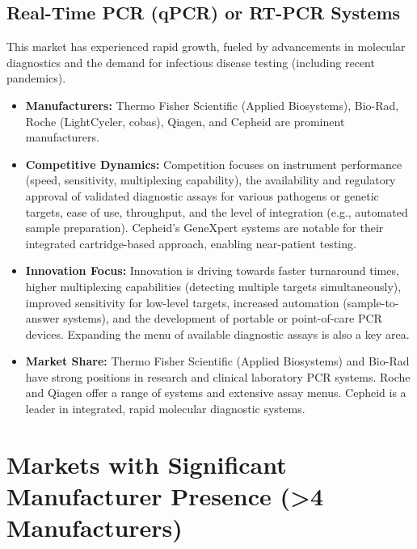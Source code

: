 \documentclass{article}
\begin{document}
\subsection{Real-Time PCR (qPCR) or RT-PCR Systems}
This market has experienced rapid growth, fueled by advancements in molecular diagnostics and the demand for infectious disease testing (including recent pandemics).
\begin{itemize}
    \item \textbf{Manufacturers:} Thermo Fisher Scientific (Applied Biosystems), Bio-Rad, Roche (LightCycler, cobas), Qiagen, and Cepheid are prominent manufacturers.
    \item \textbf{Competitive Dynamics:} Competition focuses on instrument performance (speed, sensitivity, multiplexing capability), the availability and regulatory approval of validated diagnostic assays for various pathogens or genetic targets, ease of use, throughput, and the level of integration (e.g., automated sample preparation). Cepheid's GeneXpert systems are notable for their integrated cartridge-based approach, enabling near-patient testing.
    \item \textbf{Innovation Focus:} Innovation is driving towards faster turnaround times, higher multiplexing capabilities (detecting multiple targets simultaneously), improved sensitivity for low-level targets, increased automation (sample-to-answer systems), and the development of portable or point-of-care PCR devices. Expanding the menu of available diagnostic assays is also a key area.
    \item \textbf{Market Share:} Thermo Fisher Scientific (Applied Biosystems) and Bio-Rad have strong positions in research and clinical laboratory PCR systems. Roche and Qiagen offer a range of systems and extensive assay menus. Cepheid is a leader in integrated, rapid molecular diagnostic systems.
\end{itemize}

\section{Markets with Significant Manufacturer Presence (>4 Manufacturers)}
\end{document}
